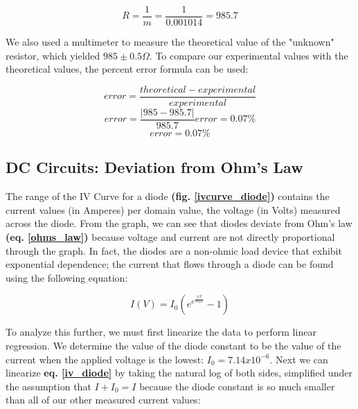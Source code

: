 \documentclass{article}
\begin{document}
\begin{equation}
    \label{ohms_law_slope}
    R = \frac{1}{m} = \frac{1}{0.001014} = 985.7
\end{equation}

We also used a multimeter to measure the theoretical value of the "unknown"
resistor, which yielded $985\pm0.5\Omega$. To compare our experimental values
with the theoretical values, the percent error formula can be used:

\begin{equation}
    \label{percent_error}
    error = \frac{theoretical-experimental}{experimental}
\end{equation}
\begin{equation}
    \label{error_ohms_law_2}
    error = \frac{|985-985.7|}{985.7}
    error = 0.07\%
\end{equation}
\begin{equation}
    \label{error_ohms_law_3}
    error = 0.07\%
\end{equation}


\subsection{DC Circuits: Deviation from Ohm's Law}

The range of the IV Curve for a diode \textbf{(fig. \ref{ivcurve_diode})}
contains the current values (in Amperes) per domain value, the voltage (in
Volts) measured across the diode. From the graph, we can see that diodes deviate
from Ohm's law \textbf{(eq. \ref{ohms_law})} because voltage and current are not
directly proportional through the graph. In fact, the diodes are a non-ohmic
load device that exhibit exponential dependence; the current that
flows through a diode can be found using the following equation:

\begin{equation}
    \label{iv_diode}
    I(V) = I_{0}(e^{e^{\frac{|e|V}{nk_{B}T}}}-1)
\end{equation}

To analyze this further, we must first linearize the data to perform linear
regression. We determine the value of the diode constant to be the value of the
current when the applied voltage is the lowest: $I_{0} = 7.14 x 10^{-6}$. Next
we can linearize \textbf{eq. \ref{iv_diode}} by taking the natural log of both
sides, simplified under the assumption that $I+I_{0}=I$ because the diode
constant is so much smaller than all of our other measured current values:
\end{document}

